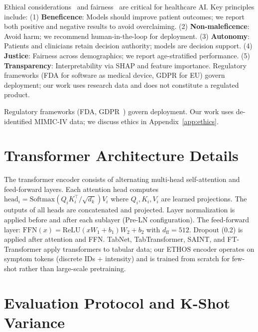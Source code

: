 Ethical considerations~\cite{floridi2018ai4people,jobin2019global,gerke2020ethical} and fairness~\cite{obermeyer2019dissecting,chouldechova2017fairness,rajkomar2019ensuring} are critical for healthcare AI. Key principles include: (1) \textbf{Beneficence}: Models should improve patient outcomes; we report both positive and negative results to avoid overclaiming. (2) \textbf{Non-maleficence}: Avoid harm; we recommend human-in-the-loop for deployment. (3) \textbf{Autonomy}: Patients and clinicians retain decision authority; models are decision support. (4) \textbf{Justice}: Fairness across demographics; we report age-stratified performance. (5) \textbf{Transparency}: Interpretability via SHAP and feature importance. Regulatory frameworks (FDA for software as medical device, GDPR for EU) govern deployment; our work uses research data and does not constitute a regulated product.

Regulatory frameworks (FDA, GDPR~\cite{voigt2019eu}) govern deployment. Our work uses de-identified MIMIC-IV data; we discuss ethics in Appendix~\ref{app:ethics}.

\section{Transformer Architecture Details}

The transformer encoder consists of alternating multi-head self-attention and feed-forward layers. Each attention head computes $\text{head}_i = \text{Softmax}(Q_i K_i^\top / \sqrt{d_k}) V_i$ where $Q_i, K_i, V_i$ are learned projections. The outputs of all heads are concatenated and projected. Layer normalization is applied before and after each sublayer (Pre-LN configuration). The feed-forward layer: $\text{FFN}(x) = \text{ReLU}(xW_1 + b_1)W_2 + b_2$ with $d_{\text{ff}} = 512$. Dropout (0.2) is applied after attention and FFN. TabNet, TabTransformer, SAINT, and FT-Transformer apply transformers to tabular data; our ETHOS encoder operates on symptom tokens (discrete IDs + intensity) and is trained from scratch for few-shot rather than large-scale pretraining.

\section{Evaluation Protocol and K-Shot Variance}


